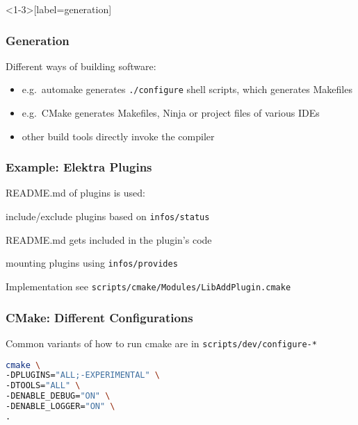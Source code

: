 \begin{frame}<1-3>[label=generation]
	\frametitle{Generation}

	Different ways of building software:

	\begin{itemize}[<+-| alert@+>]
	\item e.g.\ automake generates \texttt{./configure} shell scripts, which generates Makefiles
	\item e.g.\ CMake generates Makefiles, Ninja or project files of various IDEs
	\item other build tools directly invoke the compiler
	\end{itemize}

\end{frame}

\begin{frame}
	\frametitle{Example: Elektra Plugins}

	README.md of plugins is used:

	\vspace{1em}
	\pause

	\begin{description}[<+-| alert@+>]
	\item[during configure time:] include/exclude plugins based on \texttt{infos/status}
	\item[during build time:] README.md gets included in the plugin's code
	\item[at run time:] mounting plugins using \texttt{infos/provides}
	\end{description}

	\vspace{1em}
	\pause[\thebeamerpauses]

	Implementation see \texttt{scripts/cmake/Modules/LibAddPlugin.cmake}
\end{frame}

\begin{frame}[fragile]
	\frametitle{CMake: Different Configurations}

	Common variants of how to run cmake are in \texttt{scripts/dev/configure-*}

	\begin{lstlisting}[language=sh]
cmake \
-DPLUGINS="ALL;-EXPERIMENTAL" \
-DTOOLS="ALL" \
-DENABLE_DEBUG="ON" \
-DENABLE_LOGGER="ON" \
.\end{lstlisting}
\end{frame}

